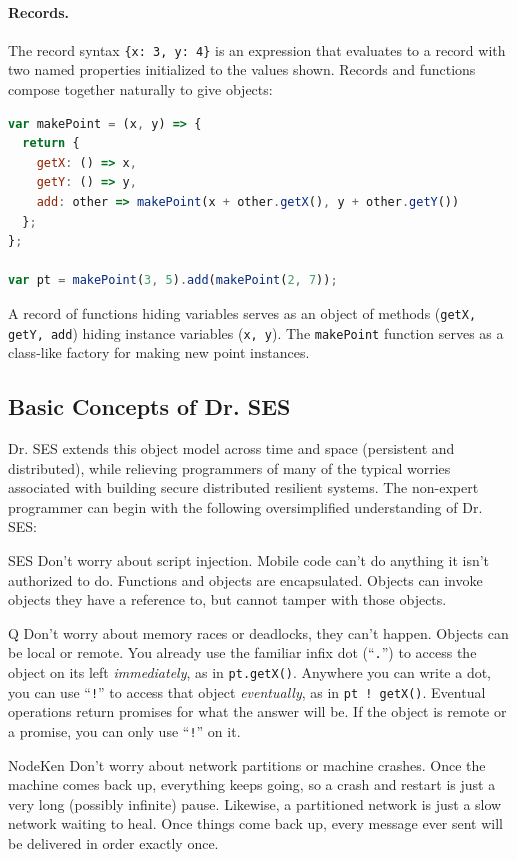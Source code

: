 \documentclass{llncs}
\begin{document}
\paragraph{Records.} 

The record syntax {\tt \{x: 3, y: 4\}} is an expression that evaluates to a record with two named properties initialized to the values shown. Records and functions compose together naturally to give objects:

\begin{lstlisting}[language=JavaScript,numbers=none]
var makePoint = (x, y) => {
  return {
    getX: () => x,
    getY: () => y,
    add: other => makePoint(x + other.getX(), y + other.getY())
  };
};

var pt = makePoint(3, 5).add(makePoint(2, 7));
\end{lstlisting}

A record of functions hiding variables serves as an object of methods ({\tt getX, getY, add}) hiding instance variables ({\tt x, y}). The {\tt makePoint} function serves as a class-like factory for making new point instances.

\subsection{Basic Concepts of Dr. SES}
\label{enoughdrses}

Dr. SES extends this object model across time and space (persistent and distributed), while relieving programmers of many of the typical worries associated with building secure distributed resilient systems. The non-expert programmer can begin with the following oversimplified understanding of Dr. SES:

\begin{description*}
\item[SES] Don't worry about script injection. Mobile code can't do anything it isn't authorized to do. Functions and objects are encapsulated. Objects can invoke objects they have a reference to, but cannot tamper with those objects.

\item[Q] Don't worry about memory races or deadlocks, they can't happen. Objects can be local or remote. You already use the familiar infix dot (``{\tt .}'') to access the object on its left \emph{immediately}, as in {\tt pt.getX()}. Anywhere you can write a dot, you can use ``{\tt !}'' to access that object \emph{eventually}, as in {\tt pt~!~getX()}. Eventual operations return promises for what the answer will be. If the object is remote or a promise, you can only use ``{\tt !}'' on it.

\item[NodeKen] Don't worry about network partitions or machine crashes. Once the machine comes back up, everything keeps going, so a crash and restart is just a very long (possibly infinite) pause. Likewise, a partitioned network is just a slow network waiting to heal. Once things come back up, every message ever sent will be delivered in order exactly once.
\end{description*}
\end{document}
